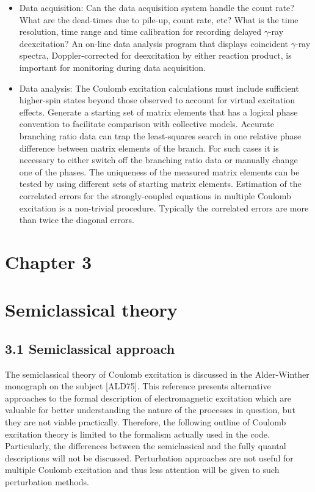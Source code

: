 \documentclass[10pt]{article}
\begin{document}
\begin{itemize}
  \item Data acquisition: Can the data acquisition system handle the count rate? What are the dead-times due to pile-up, count rate, etc? What is the time resolution, time range and time calibration for recording delayed $\gamma$-ray deexcitation? An on-line data analysis program that displays coincident $\gamma$-ray spectra, Doppler-corrected for deexcitation by either reaction product, is important for monitoring during data acquisition.
  \item Data analysis: The Coulomb excitation calculations must include sufficient higher-spin states beyond those observed to account for virtual excitation effects. Generate a starting set of matrix elements that has a logical phase convention to facilitate comparison with collective models. Accurate branching ratio data can trap the least-squares search in one relative phase difference between matrix elements of the branch. For such cases it is necessary to either switch off the branching ratio data or manually change one of the phases. The uniqueness of the measured matrix elements can be tested by using different sets of starting matrix elements. Estimation of the correlated errors for the strongly-coupled equations in multiple Coulomb excitation is a non-trivial procedure. Typically the correlated errors are more than twice the diagonal errors.
\end{itemize}

\section*{Chapter 3}
\section*{Semiclassical theory}


\subsection*{3.1 Semiclassical approach}
The semiclassical theory of Coulomb excitation is discussed in the Alder-Winther monograph on the subject [ALD75]. This reference presents alternative approaches to the formal description of electromagnetic excitation which are valuable for better understanding the nature of the processes in question, but they are not viable practically. Therefore, the following outline of Coulomb excitation theory is limited to the formalism actually used in the code. Particularly, the differences between the semiclassical and the fully quantal descriptions will not be discussed. Perturbation approaches are not useful for multiple Coulomb excitation and thus less attention will be given to such perturbation methods.
\end{document}
